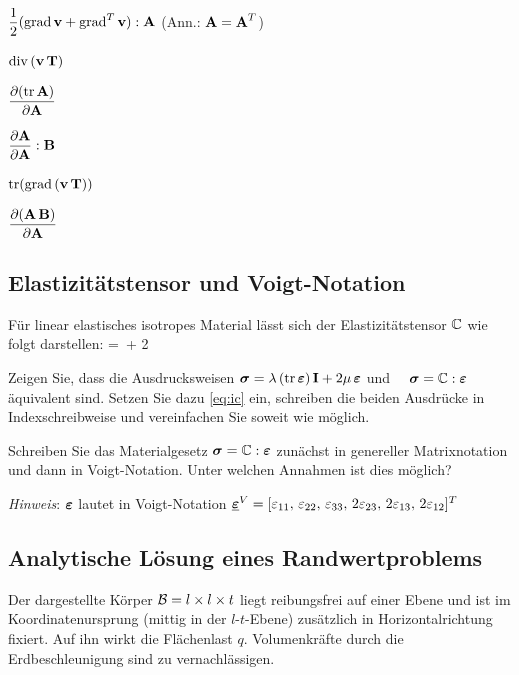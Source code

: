 \enab
\begin{minipage}[t]{0.5\textwidth}
\item $\displaystyle\frac{1}{2}(\operatorname{grad}{{{\bm{\mathrm{v}}}}+\operatorname{grad}^T{{\bm{\mathrm{v}}}})}: {{\bm{\mathrm{A}}}}$ (Ann.: ${{\bm{\mathrm{A}}}}={{\bm{\mathrm{A}}}}^T$)
\item $\operatorname{div}{({{\bm{\mathrm{v}}}}\,{{\bm{\mathrm{T}}}})}$
\item $\displaystyle\frac{\partial{(\operatorname{tr}{{{\bm{\mathrm{A}}}}})}} {\partial{{{\bm{\mathrm{A}}}}}}$
\end{minipage}
%
\begin{minipage}[t]{0.42\textwidth}
\item $\displaystyle\frac{\partial{{{\bm{\mathrm{A}}}}}} {\partial{{{\bm{\mathrm{A}}}}}} : {{\bm{\mathrm{B}}}} $
\item $\operatorname{tr}(\operatorname{grad}{({{\bm{\mathrm{v}}}}\,{{\bm{\mathrm{T}}}})})$
\item $\displaystyle\frac{\partial{({{\bm{\mathrm{A}}}}\, {{\bm{\mathrm{B}}}})}} {\partial{{{\bm{\mathrm{A}}}}}}$
\end{minipage}
\enae



\subsection{Elastizitätstensor und Voigt-Notation}

Für linear elastisches isotropes Material lässt sich der Elastizitätstensor $\mathbb{C}$ wie folgt darstellen:
\eb \IC=\lambda\, \bI \otimes \bI + 2 \mu \, \II \label{eq:ic}\ee

\enab
\item Zeigen Sie, dass die Ausdrucksweisen
$ {\bm{\sigma }}=\lambda \, (\operatorname{tr}{{\bm{\varepsilon }}})\,  {{\bm{\mathrm{I}}}} + 2 \mu \, {\bm{\varepsilon }} $ und 
$\quad {\bm{\sigma }}= \mathbb{C} : {\bm{\varepsilon }} $
äquivalent sind.
Setzen Sie dazu \eqref{eq:ic} ein, schreiben die beiden Ausdrücke in Indexschreibweise und vereinfachen Sie soweit wie möglich.

\item Schreiben Sie das Materialgesetz ${\bm{\sigma }}= \mathbb{C} : {\bm{\varepsilon }}$ zunächst in genereller Matrixnotation und dann in Voigt-Notation.
Unter welchen Annahmen ist dies möglich?
\par \textit{Hinweis}: ${\bm{\varepsilon }}$ lautet in Voigt-Notation $\underline{\bm{\varepsilon }}^V=[\varepsilon_{11},\,\varepsilon_{22},\,\varepsilon_{33},\,2\varepsilon_{23},\,2\varepsilon_{13},\,2\varepsilon_{12}]^T$
\enae



\clearpage
\subsection{Analytische Lösung eines Randwertproblems}

Der dargestellte Körper $\mathcal{B}=l\times l\times t$ liegt reibungsfrei auf einer Ebene und ist im Koordinatenursprung (mittig in der $l$-$t$-Ebene) zusätzlich in Horizontalrichtung fixiert.
Auf ihn wirkt die Flächenlast $q$. 
Volumenkräfte durch die Erdbeschleunigung sind zu vernachlässigen.


